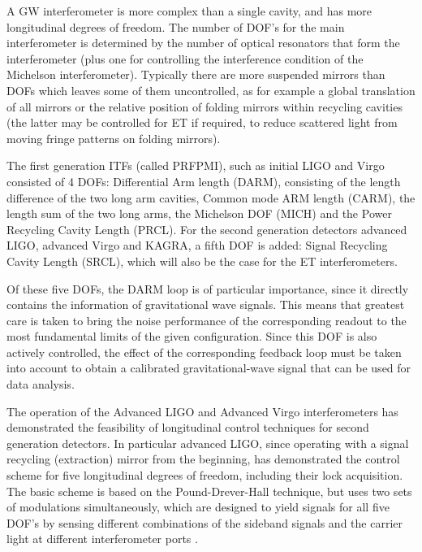 A GW interferometer is more complex than a single cavity, and has more longitudinal degrees of freedom. 
The number of DOF's for the main interferometer is determined by the number of optical resonators that form
the interferometer (plus one for controlling the interference condition of the Michelson interferometer). Typically there are more suspended mirrors than DOFs which leaves some of them uncontrolled, as for example a global translation of all mirrors or the relative position of folding mirrors within recycling cavities (the latter may be controlled for ET if required, to reduce scattered light from moving fringe patterns on folding mirrors).

The first generation ITFs (called PRFPMI), such as initial LIGO and Virgo consisted of 4 DOFs: Differential Arm length (DARM), consisting of the length difference of the two long arm cavities, Common mode ARM length (CARM), the length sum of the two long arms, the Michelson DOF (MICH) and the Power Recycling Cavity Length (PRCL). For the second generation detectors advanced LIGO, advanced Virgo and KAGRA, a fifth DOF is added: Signal Recycling Cavity Length (SRCL), which will also be the case for the ET interferometers.


Of these five DOFs, the DARM loop is of particular importance, since it directly contains the information of gravitational wave signals. This means that greatest care is taken to bring the noise performance of the corresponding readout to the most fundamental limits of the given configuration.
Since this DOF is also actively controlled, the effect of the corresponding feedback loop must be taken into account to obtain a calibrated gravitational-wave signal that can be used for data analysis.

The operation of the Advanced LIGO and Advanced Virgo interferometers
has demonstrated the feasibility of longitudinal control techniques for second generation detectors.
In particular advanced LIGO, since operating with a signal recycling (extraction) mirror from the beginning,
has demonstrated the control scheme for five longitudinal degrees of freedom,
including their lock acquisition. 
The basic scheme is based on the Pound-Drever-Hall technique, but uses two sets of modulations simultaneously,
which are designed to yield signals for all five DOF's by sensing different combinations of the sideband signals and the carrier light at different interferometer ports \cite{SensingStrain:2003}.

